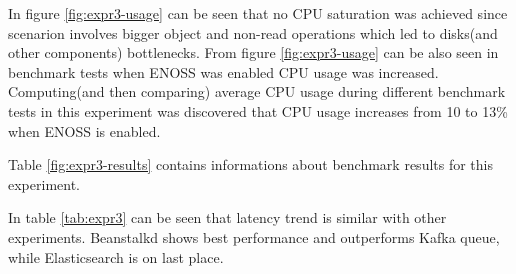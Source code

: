     In figure \ref{fig:expr3-usage} can be seen that no CPU saturation was achieved since scenarion involves bigger object and non-read operations which led to disks(and other components) bottlenecks. From figure \ref{fig:expr3-usage} can be also seen in benchmark tests when ENOSS was enabled CPU usage was increased. Computing(and then comparing) average CPU usage during different benchmark tests in this experiment was discovered that CPU usage increases from 10 to 13\% when ENOSS is enabled.

    Table \ref{fig:expr3-results} contains informations about benchmark results for this experiment.

    In table \ref{tab:expr3} can be seen that latency trend is similar with other experiments. Beanstalkd shows best performance and outperforms Kafka queue, while Elasticsearch is on last place.

